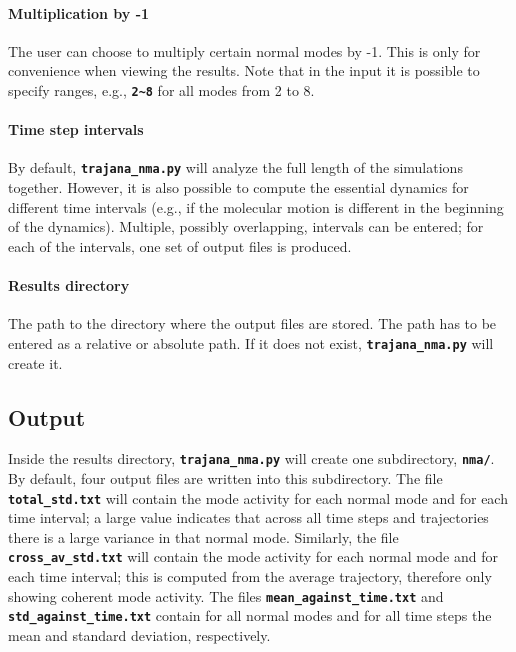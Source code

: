 \documentclass[a4paper,10pt,DIV=15,openany,twoside=false]{scrbook}
\newcommand{\ttt}[1]{\textbf{\texttt{#1}}}
\begin{document}
\paragraph{Multiplication by -1}

The user can choose to multiply certain normal modes by -1.
This is only for convenience when viewing the results.
Note that in the input it is possible to specify ranges, e.g., \ttt{2\textasciitilde8} for all modes from 2 to 8.

\paragraph{Time step intervals}

By default, \ttt{trajana\_nma.py} will analyze the full length of the simulations together. 
However, it is also possible to compute the essential dynamics for different time intervals (e.g., if the molecular motion is different in the beginning of the dynamics).
Multiple, possibly overlapping, intervals can be entered; for each of the intervals, one set of output files is produced.

\paragraph{Results directory}

The path to the directory where the output files are stored.
The path has to be entered as a relative or absolute path.
If it does not exist, \ttt{trajana\_nma.py} will create it.

\subsection{Output}

Inside the results directory, \ttt{trajana\_nma.py} will create one subdirectory, \ttt{nma/}.
By default, four output files are written into this subdirectory.
The file \ttt{total\_std.txt} will contain the mode activity for each normal mode and for each time interval; a large value indicates that across all time steps and trajectories there is a large variance in that normal mode.
Similarly, the file \ttt{cross\_av\_std.txt} will contain the mode activity for each normal mode and for each time interval; this is computed from the average trajectory, therefore only showing coherent mode activity.
The files \ttt{mean\_against\_time.txt} and \ttt{std\_against\_time.txt} contain for all normal modes and for all time steps the mean and standard deviation, respectively.
\end{document}
